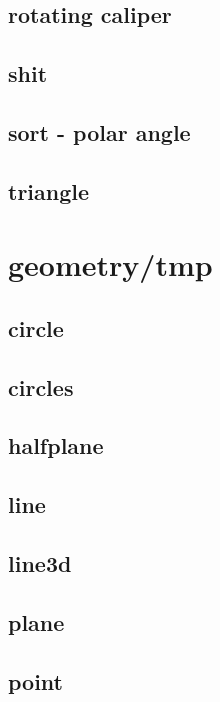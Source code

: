 \documentclass[a4paper,5pt,titlepage]{article}
\begin{document}
\subsection{rotating caliper}

\subsection{shit}

\subsection{sort - polar angle}

\subsection{triangle}

\section{geometry/tmp}
\subsection{circle}

\subsection{circles}

\subsection{halfplane}

\subsection{line}

\subsection{line3d}

\subsection{plane}

\subsection{point}

\end{document}
